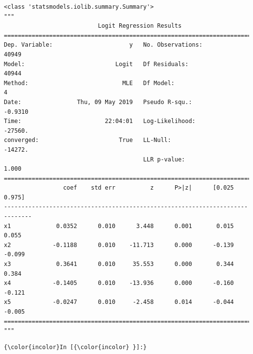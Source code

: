 \documentclass[8pt,onecolumn,aps,pra]{revtex4-1}
\begin{document}
    
    \begin{verbatim}
<class 'statsmodels.iolib.summary.Summary'>
"""
                           Logit Regression Results                           
==============================================================================
Dep. Variable:                      y   No. Observations:                40949
Model:                          Logit   Df Residuals:                    40944
Method:                           MLE   Df Model:                            4
Date:                Thu, 09 May 2019   Pseudo R-squ.:                 -0.9310
Time:                        22:04:01   Log-Likelihood:                -27560.
converged:                       True   LL-Null:                       -14272.
                                        LLR p-value:                     1.000
==============================================================================
                 coef    std err          z      P>|z|      [0.025      0.975]
------------------------------------------------------------------------------
x1             0.0352      0.010      3.448      0.001       0.015       0.055
x2            -0.1188      0.010    -11.713      0.000      -0.139      -0.099
x3             0.3641      0.010     35.553      0.000       0.344       0.384
x4            -0.1405      0.010    -13.936      0.000      -0.160      -0.121
x5            -0.0247      0.010     -2.458      0.014      -0.044      -0.005
==============================================================================
"""
    \end{verbatim}

    \begin{Verbatim}[commandchars=\\\{\}]
{\color{incolor}In [{\color{incolor} }]:} 
\end{Verbatim}
\end{document}
